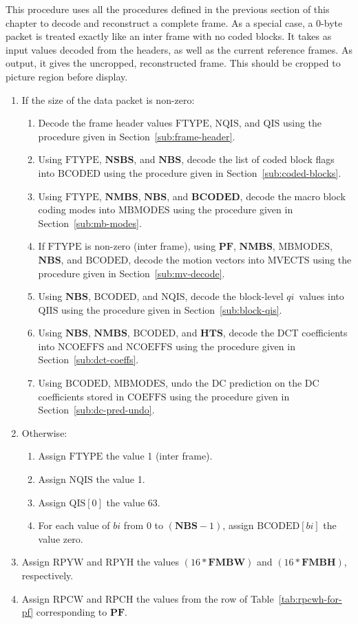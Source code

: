 \documentclass[9pt,letterpaper]{book}
\newcommand{\idx}[1]{{\ensuremath{\mathit{#1}}}}
\newcommand{\qi}{\idx{qi}}
\newcommand{\bi}{\idx{bi}}
\newcommand{\bitvar}[1]{\ensuremath{\mathbf{\bm{#1}}}}
\newcommand{\locvar}[1]{\ensuremath{\mathrm{#1}}}
\numberwithin{equation}{chapter}
\numberwithin{figure}{chapter}
\numberwithin{table}{chapter}
\begin{document}
This procedure uses all the procedures defined in the previous section of this
 chapter to decode and reconstruct a complete frame.
As a special case, a 0-byte packet is treated exactly like an inter frame with
 no coded blocks.
It takes as input values decoded from the headers, as well as the current
 reference frames.
As output, it gives the uncropped, reconstructed frame.
This should be cropped to picture region before display.

\begin{enumerate}
\item
If the size of the data packet is non-zero:
\begin{enumerate}
\item
Decode the frame header values \locvar{FTYPE}, \locvar{NQIS}, and \locvar{QIS}
 using the procedure given in Section~\ref{sub:frame-header}.
\item
Using \locvar{FTYPE}, \bitvar{NSBS}, and \bitvar{NBS}, decode the list of coded
 block flags into \locvar{BCODED} using the procedure given in
 Section~\ref{sub:coded-blocks}.
\item
Using \locvar{FTYPE}, \bitvar{NMBS}, \bitvar{NBS}, and \bitvar{BCODED}, decode
 the macro block coding modes into \locvar{MBMODES} using the procedure given
 in Section~\ref{sub:mb-modes}.
\item
If \locvar{FTYPE} is non-zero (inter frame), using \bitvar{PF}, \bitvar{NMBS},
 \locvar{MBMODES}, \bitvar{NBS}, and \locvar{BCODED}, decode the motion vectors
 into \locvar{MVECTS} using the procedure given in Section~\ref{sub:mv-decode}.
\item
Using \bitvar{NBS}, \locvar{BCODED}, and \locvar{NQIS}, decode the block-level
 \qi\ values into \locvar{QIIS} using the procedure given in
 Section~\ref{sub:block-qis}.
\item
Using \bitvar{NBS}, \bitvar{NMBS}, \locvar{BCODED}, and \bitvar{HTS}, decode
 the DCT coefficients into \locvar{NCOEFFS} and \locvar{NCOEFFS} using the
 procedure given in Section~\ref{sub:dct-coeffs}.
\item
Using \locvar{BCODED}, \locvar{MBMODES}, undo the DC prediction on the DC
 coefficients stored in \locvar{COEFFS} using the procedure given in
 Section~\ref{sub:dc-pred-undo}.
\end{enumerate}
\item
Otherwise:
\begin{enumerate}
\item
Assign \locvar{FTYPE} the value 1 (inter frame).
\item
Assign \locvar{NQIS} the value 1.
\item
Assign $\locvar{QIS}[0]$ the value 63.
\item
For each value of \locvar{\bi} from 0 to $(\bitvar{NBS}-1)$, assign
 $\locvar{BCODED}[\locvar{\bi}]$ the value zero.
\end{enumerate}
\item
Assign \locvar{RPYW} and \locvar{RPYH} the values $(16*\bitvar{FMBW})$ and
 $(16*\bitvar{FMBH})$, respectively.
\item
Assign \locvar{RPCW} and \locvar{RPCH} the values from the row of
 Table~\ref{tab:rpcwh-for-pf} corresponding to \bitvar{PF}.


\end{enumerate}
\end{document}
